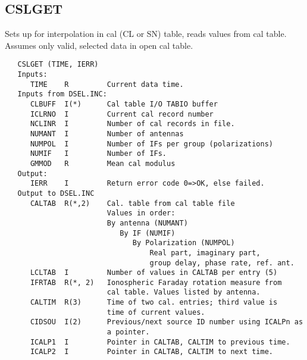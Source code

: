 \subsection{CSLGET}
Sets up for interpolation in cal (CL or SN) table, reads values from cal
table.  Assumes only valid, selected data in open cal table.
\begin{verbatim}
   CSLGET (TIME, IERR)
   Inputs:
      TIME    R         Current data time.
   Inputs from DSEL.INC:
      CLBUFF  I(*)      Cal table I/O TABIO buffer
      ICLRNO  I         Current cal record number
      NCLINR  I         Number of cal records in file.
      NUMANT  I         Number of antennas
      NUMPOL  I         Number of IFs per group (polarizations)
      NUMIF   I         Number of IFs.
      GMMOD   R         Mean cal modulus
   Output:
      IERR    I         Return error code 0=>OK, else failed.
   Output to DSEL.INC
      CALTAB  R(*,2)    Cal. table from cal table file
                        Values in order:
                        By antenna (NUMANT)
                           By IF (NUMIF)
                              By Polarization (NUMPOL)
                                  Real part, imaginary part,
                                  group delay, phase rate, ref. ant.
      LCLTAB  I         Number of values in CALTAB per entry (5)
      IFRTAB  R(*, 2)   Ionospheric Faraday rotation measure from
                        cal table. Values listed by antenna.
      CALTIM  R(3)      Time of two cal. entries; third value is
                        time of current values.
      CIDSOU  I(2)      Previous/next source ID number using ICALPn as
                        a pointer.
      ICALP1  I         Pointer in CALTAB, CALTIM to previous time.
      ICALP2  I         Pointer in CALTAB, CALTIM to next time.
\end{verbatim}


